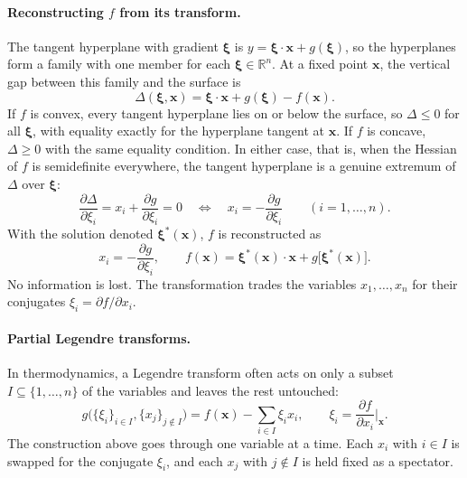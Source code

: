 \paragraph{Reconstructing $f$ from its transform.}
The tangent hyperplane with gradient $\boldsymbol{\xi}$ is
$y=\boldsymbol{\xi}\cdot\mathbf{x}+g(\boldsymbol{\xi})$, so the hyperplanes
form a family with one member for each $\boldsymbol{\xi}\in\mathbb{R}^n$.
At a fixed point $\mathbf{x}$, the vertical gap between this family and the
surface is
\begin{equation*}
    \Delta(\boldsymbol{\xi},\mathbf{x})
    =\boldsymbol{\xi}\cdot\mathbf{x}+g(\boldsymbol{\xi})-f(\mathbf{x}).
\end{equation*}
If $f$ is convex, every tangent hyperplane lies on or below the surface, so
$\Delta\leq0$ for all $\boldsymbol{\xi}$, with equality exactly for the
hyperplane tangent at $\mathbf{x}$. If $f$ is concave, $\Delta\geq0$ with the
same equality condition. In either case, that is, when the Hessian of $f$ is
semidefinite everywhere, the tangent hyperplane is a genuine extremum of
$\Delta$ over $\boldsymbol{\xi}$:
\begin{equation*}
    \frac{\partial\Delta}{\partial\xi_i}
    =x_i+\frac{\partial g}{\partial\xi_i}=0
    \quad\Longleftrightarrow\quad
    x_i=-\frac{\partial g}{\partial\xi_i}
    \qquad(i=1,\ldots,n).
\end{equation*}
With the solution denoted $\boldsymbol{\xi}^*(\mathbf{x})$, $f$ is
reconstructed as
\begin{equation}
    \boxed{x_i=-\frac{\partial g}{\partial\xi_i},\qquad
    f(\mathbf{x})=\boldsymbol{\xi}^*(\mathbf{x})\cdot\mathbf{x}
    +g\big[\boldsymbol{\xi}^*(\mathbf{x})\big].}
\end{equation}
No information is lost. The transformation trades the variables
$x_1,\ldots,x_n$ for their conjugates $\xi_i=\partial f/\partial x_i$.

\paragraph{Partial Legendre transforms.}
In thermodynamics, a Legendre transform often acts on only a subset
$I\subseteq\{1,\ldots,n\}$ of the variables and leaves the rest untouched:
\begin{equation}
    \boxed{g\big(\{\xi_i\}_{i\in I},\{x_j\}_{j\notin I}\big)
    =f(\mathbf{x})-\sum_{i\in I}\xi_i x_i,
    \qquad \xi_i=\frac{\partial f}{\partial x_i}\bigg|_{\mathbf{x}}.}
\end{equation}
The construction above goes through one variable at a time. Each $x_i$ with
$i\in I$ is swapped for the conjugate $\xi_i$, and each $x_j$ with
$j\notin I$ is held fixed as a spectator.


